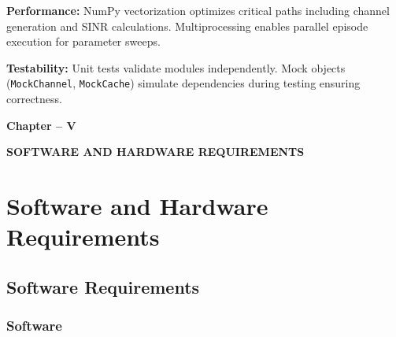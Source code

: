 \documentclass[12pt,a4paper]{article}
\begin{document}
\textbf{Performance:} NumPy vectorization optimizes critical paths including channel generation and SINR calculations. Multiprocessing enables parallel episode execution for parameter sweeps.

\textbf{Testability:} Unit tests validate modules independently. Mock objects (\texttt{MockChannel}, \texttt{MockCache}) simulate dependencies during testing ensuring correctness.

\thispagestyle{plain}


\clearpage

\begin{center}
    \vspace*{10cm}
    
    {\fontsize{16}{19.2}\selectfont\bfseries
    Chapter -- V}
    
    \vspace{1cm}
    
    {\fontsize{16}{19.2}\selectfont\bfseries
    SOFTWARE AND HARDWARE REQUIREMENTS}
    
    \vspace*{\fill}
\end{center}

\thispagestyle{plain}


\clearpage

\section{Software and Hardware Requirements}

\subsection{Software Requirements}

\subsubsection{Software}
\end{document}
